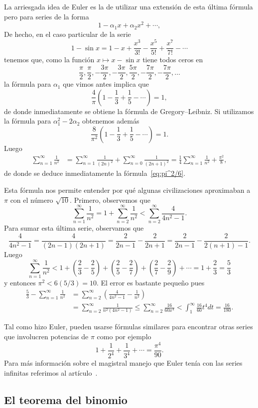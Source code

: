 La arriesgada idea de Euler es la de utilizar una extensión de esta última
fórmula pero para series de la forma
\[
	1-\alpha_1x+\alpha_2x^2+\cdots,
\]
De hecho, en el caso particular de la serie
\[
	1-\sin x=1-x+\frac{x^3}{3!}-\frac{x^5}{5!}+\frac{x^7}{7!}-\cdots
\]
tenemos que, como la función $x\mapsto x-\sin x$ tiene todos ceros en 
\[
	\frac{\pi}{2},\frac{\pi}{2},-\frac{3\pi}{2},-\frac{3\pi}{2},\frac{5\pi}{2},-\frac{7\pi}{2},-\frac{7\pi}{2},\dots
\]
la fórmula para $\alpha_1$ que vimos antes implica que
\[
	\frac{4}{\pi}\left(1-\frac13+\frac15-\cdots\right)=1,
\]
de donde inmediatamente se obtiene la fórmula de Gregory--Leibniz.  Si utilizamos la
fórmula para $\alpha_1^2-2\alpha_2$ obtenemos además 
\[
	\frac{8}{\pi^2}\left(1-\frac13+\frac15-\cdots\right)=1.
\]
Luego
\begin{align*}
	\sum_{n=1}^\infty\frac{1}{n^2} &= \sum_{n=1}^\infty\frac{1}{(2n)^2}+\sum_{n=0}^\infty\frac{1}{(2n+1)^2}=\frac14\sum_{n=1}^\infty\frac{1}{n^2}+\frac{\pi^2}{8},
\end{align*}
de donde se deduce inmediatamente la fórmula~\eqref{eq:pi^2/6}.

Esta fórmula nos permite entender por qué algunas civilizaciones aproximaban a
$\pi$ con el número $\sqrt{10}$. Primero, observemos que 
\[
	\sum_{n=1}^\infty\frac{1}{n^2}=1+\sum_{n=2}^\infty\frac{1}{n^2}<\sum_{n=2}^\infty\frac{4}{4n^2-1}.
\]
Para sumar esta última serie, observamos que
\[
	\frac{4}{4n^2-1}=\frac{4}{(2n-1)(2n+1)}=\frac{2}{2n-1}-\frac{2}{2n+1}=\frac{2}{2n-1}-\frac{2}{2(n+1)-1}.
\]
Luego 
\[
	\sum_{n=1}^\infty\frac{1}{n^2}<1+\left(\frac23-\frac25\right)+\left(\frac25-\frac27\right)+\left(\frac27-\frac29\right)+\cdots=1+\frac23=\frac53
\]
y entonces $\pi^2<6(5/3)=10$. El error es bastante pequeño pues 
\begin{align*}
	\frac53-\sum_{n=1}^\infty\frac{1}{n^2}
	&=\sum_{n=2}^\infty\left(\frac{4}{4n^2-1}-\frac{1}{n^2}\right)\\
	&=\sum_{n=2}^\infty\frac{1}{n^2(4n^2-1)}
	\leq\sum_{n=2}^\infty\frac{16}{60x^4}
	<\int_1^{\infty}\frac{16}{60}t^4dt=\frac{16}{180}.
\end{align*}

Tal como hizo Euler, pueden usarse fórmulas similares para encontrar otras series 
que involucren potencias de $\pi$ como por ejemplo
\[
	1+\frac{1}{2^4}+\frac{1}{3^4}+\cdots=\frac{\pi^4}{90}.
\]
Para más información sobre el magistral manejo que Euler tenía con las series
infinitas referimos al artículo~\cite{MR2338363}.


\subsection*{El teorema del binomio}

